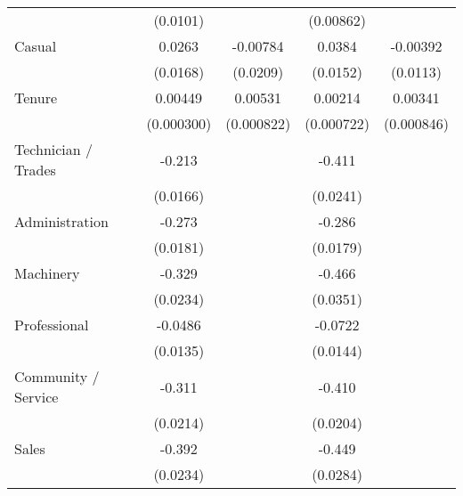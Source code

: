 {\begin{tabular}{l*{4}{c}}
                    &    (0.0101)         &                     &   (0.00862)         &                     \\
[1em]
Casual              &      0.0263         &    -0.00784         &      0.0384\sym{*}  &    -0.00392         \\
                    &    (0.0168)         &    (0.0209)         &    (0.0152)         &    (0.0113)         \\
[1em]
Tenure              &     0.00449\sym{***}&     0.00531\sym{***}&     0.00214\sym{**} &     0.00341\sym{***}\\
                    &  (0.000300)         &  (0.000822)         &  (0.000722)         &  (0.000846)         \\
[1em]
Technician / Trades &      -0.213\sym{***}&                     &      -0.411\sym{***}&                     \\
                    &    (0.0166)         &                     &    (0.0241)         &                     \\
[1em]
Administration      &      -0.273\sym{***}&                     &      -0.286\sym{***}&                     \\
                    &    (0.0181)         &                     &    (0.0179)         &                     \\
[1em]
Machinery           &      -0.329\sym{***}&                     &      -0.466\sym{***}&                     \\
                    &    (0.0234)         &                     &    (0.0351)         &                     \\
[1em]
Professional        &     -0.0486\sym{***}&                     &     -0.0722\sym{***}&                     \\
                    &    (0.0135)         &                     &    (0.0144)         &                     \\
[1em]
Community / Service &      -0.311\sym{***}&                     &      -0.410\sym{***}&                     \\
                    &    (0.0214)         &                     &    (0.0204)         &                     \\
[1em]
Sales               &      -0.392\sym{***}&                     &      -0.449\sym{***}&                     \\
                    &    (0.0234)         &                     &    (0.0284)         &                     \\

\end{tabular}}
